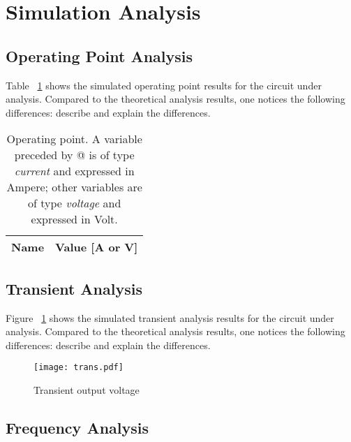 \section{Simulation Analysis}
\label{sec:simulation}

\subsection{Operating Point Analysis}

Table ~\ref{tab:op} shows the simulated operating point results for the circuit
under analysis. Compared to the theoretical analysis results, one notices the
following differences: describe and explain the differences.

\begin{table}[h]
  \centering
  \begin{tabular}{|l|r|}
    \hline    
    {\bf Name} & {\bf Value [A or V]} \\ \hline
    
  \end{tabular}
  \caption{Operating point. A variable preceded by @ is of type {\em current}
    and expressed in Ampere; other variables are of type {\it voltage} and expressed in
    Volt.}
  \label{tab:op}
\end{table}


\subsection{Transient Analysis}

Figure ~\ref{fig:trans} shows the simulated transient analysis results for the
circuit under analysis. Compared to the theoretical analysis results, one
notices the following differences: describe and explain the differences.

\begin{figure}[h]
	\centering
	\texttt{[image: trans.pdf]}
	\caption{Transient output voltage}
\label{fig:trans}
\end{figure}


\subsection{Frequency Analysis}

